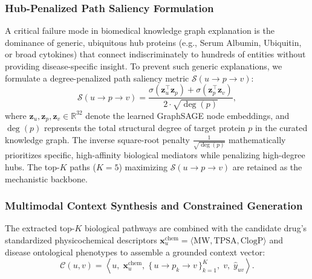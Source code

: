 \documentclass[conference,a4paper]{IEEEtran}
\begin{document}
\subsubsection{Hub-Penalized Path Saliency Formulation}
A critical failure mode in biomedical knowledge graph explanation is the dominance of generic, ubiquitous hub proteins (e.g., Serum Albumin, Ubiquitin, or broad cytokines) that connect indiscriminately to hundreds of entities without providing disease-specific insight. To prevent such generic explanations, we formulate a degree-penalized path saliency metric $\mathcal{S}(u \to p \to v)$:
\begin{equation}
    \mathcal{S}(u \to p \to v) = \frac{\sigma\left(\mathbf{z}_u^\top \mathbf{z}_p\right) + \sigma\left(\mathbf{z}_p^\top \mathbf{z}_v\right)}{2 \cdot \sqrt{\deg(p)}},
\end{equation}
where $\mathbf{z}_u, \mathbf{z}_p, \mathbf{z}_v \in \mathbb{R}^{32}$ denote the learned GraphSAGE node embeddings, and $\deg(p)$ represents the total structural degree of target protein $p$ in the curated knowledge graph. The inverse square-root penalty $\frac{1}{\sqrt{\deg(p)}}$ mathematically prioritizes specific, high-affinity biological mediators while penalizing high-degree hubs. The top-$K$ paths ($K=5$) maximizing $\mathcal{S}(u \to p \to v)$ are retained as the mechanistic backbone.

\subsubsection{Multimodal Context Synthesis and Constrained Generation}
The extracted top-$K$ biological pathways are combined with the candidate drug's standardized physicochemical descriptors $\mathbf{x}_u^{\mathrm{chem}} = \langle \mathrm{MW}, \mathrm{TPSA}, \mathrm{ClogP} \rangle$ and disease ontological phenotypes to assemble a grounded context vector:
\begin{equation}
    \mathcal{C}(u, v) = \left\langle u, \; \mathbf{x}_u^{\mathrm{chem}}, \; \{\, u \to p_k \to v \,\}_{k=1}^K, \; v, \; \hat{y}_{uv} \right\rangle.
\end{equation}
\end{document}

